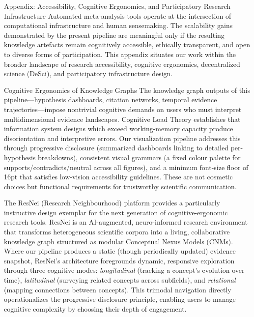 \documentclass[
  ignorenonframetext,
]{beamer}
\author{\texorpdfstring{}{}}
\date{}
\begin{document}
\begin{frame}{Appendix: Accessibility, Cognitive Ergonomics, and
Participatory Research Infrastructure \label{sec:accessibility}}
\protect{}\label{appendix-accessibility-cognitive-ergonomics-and-participatory-research-infrastructure}
Automated meta-analysis tools operate at the intersection of
computational infrastructure and human sensemaking. The scalability
gains demonstrated by the present pipeline are meaningful only if the
resulting knowledge artefacts remain cognitively accessible, ethically
transparent, and open to diverse forms of participation. This appendix
situates our work within the broader landscape of research
accessibility, cognitive ergonomics, decentralized science (DeSci), and
participatory infrastructure design.

\begin{block}{Cognitive Ergonomics of Knowledge Graphs}
\protect{}\label{cognitive-ergonomics-of-knowledge-graphs}
The knowledge graph outputs of this pipeline---hypothesis dashboards,
citation networks, temporal evidence trajectories---impose nontrivial
cognitive demands on users who must interpret multidimensional evidence
landscapes. Cognitive Load Theory \citep{sweller2011cognitive}
establishes that information system designs which exceed working-memory
capacity produce disorientation and interpretive errors. Our
visualization pipeline addresses this through progressive disclosure
(summarized dashboards linking to detailed per-hypothesis breakdowns),
consistent visual grammars (a fixed colour palette for
supports/contradicts/neutral across all figures), and a minimum
font-size floor of 16pt that satisfies low-vision accessibility
guidelines. These are not cosmetic choices but functional requirements
for trustworthy scientific communication.

The ResNei (Research Neighbourhood) platform \citep{lumiruusu2025resnei}
provides a particularly instructive design exemplar for the next
generation of cognitive-ergonomic research tools. ResNei is an
AI-augmented, neuro-informed research environment that transforms
heterogeneous scientific corpora into a living, collaborative knowledge
graph structured as modular Conceptual Nexus Models (CNMs). Where our
pipeline produces a static (though periodically updated) evidence
snapshot, ResNei's architecture foregrounds dynamic, responsive
exploration through three cognitive modes: \textit{longitudinal}
(tracking a concept's evolution over time), \textit{latitudinal}
(surveying related concepts across subfields), and \textit{relational}
(mapping connections between concepts). This trimodal navigation
directly operationalizes the progressive disclosure principle, enabling
users to manage cognitive complexity by choosing their depth of
engagement.


\end{block}
\end{frame}
\end{document}
